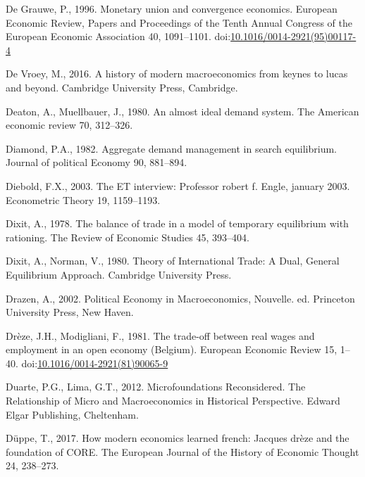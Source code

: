 \documentclass[
  12pt,
  onecolumn]{article}
\newlength{\cslhangindent}
\newlength{\cslentryspacingunit} %
\newenvironment{CSLReferences}[2] %
 {%
  \setlength{\parindent}{0pt}
  \ifodd #1
  \let\oldpar\par
  \def\par{\hangindent=\cslhangindent\oldpar}
  \fi
  \setlength{\parskip}{#2\cslentryspacingunit}
 }%
 {}
\begin{document}
\begin{CSLReferences}{1}{0}
\leavevmode{}%
De Grauwe, P., 1996. Monetary union and convergence economics. European
Economic Review, Papers and {Proceedings} of the {Tenth Annual Congress}
of the {European Economic Association} 40, 1091--1101.
doi:\href{https://doi.org/10.1016/0014-2921(95)00117-4}{10.1016/0014-2921(95)00117-4}

\leavevmode{}%
De Vroey, M., 2016. A history of modern macroeconomics from keynes to
lucas and beyond. Cambridge University Press, Cambridge.

\leavevmode{}%
Deaton, A., Muellbauer, J., 1980. An almost ideal demand system. The
American economic review 70, 312--326.

\leavevmode{}%
Diamond, P.A., 1982. Aggregate demand management in search equilibrium.
Journal of political Economy 90, 881--894.

\leavevmode{}%
Diebold, F.X., 2003. The {ET} interview: {Professor} robert f. Engle,
january 2003. Econometric Theory 19, 1159--1193.

\leavevmode{}%
Dixit, A., 1978. The balance of trade in a model of temporary
equilibrium with rationing. The Review of Economic Studies 45, 393--404.

\leavevmode{}%
Dixit, A., Norman, V., 1980. Theory of {International Trade}: {A Dual},
{General Equilibrium Approach}. {Cambridge University Press}.

\leavevmode{}%
Drazen, A., 2002. Political {Economy} in {Macroeconomics}, Nouvelle. ed.
{Princeton University Press}, {New Haven}.

\leavevmode{}%
Drèze, J.H., Modigliani, F., 1981. The trade-off between real wages and
employment in an open economy ({Belgium}). European Economic Review 15,
1--40.
doi:\href{https://doi.org/10.1016/0014-2921(81)90065-9}{10.1016/0014-2921(81)90065-9}

\leavevmode{}%
Duarte, P.G., Lima, G.T., 2012. Microfoundations {Reconsidered}. {The
Relationship} of {Micro} and {Macroeconomics} in {Historical
Perspective}. {Edward Elgar Publishing}, {Cheltenham}.

\leavevmode{}%
Düppe, T., 2017. How modern economics learned french: Jacques drèze and
the foundation of CORE. The European Journal of the History of Economic
Thought 24, 238--273.


\end{CSLReferences}
\end{document}
